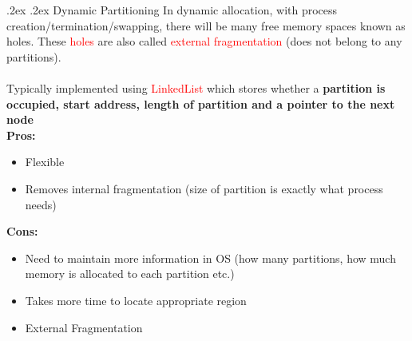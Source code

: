 \documentclass[13pt,landscape,a4paper]{article}
\makeatletter
\newcommand\red[1]{\textcolor{red}{#1}}
\renewcommand{\subsubsection}{\@startsection{subsubsection}{1}{0mm}%
    {.2ex}%
    {.2ex}%
    {\rmfamily\bfseries}}
\makeatother
\begin{document}
\begin{multicols*}{3}
        \subsubsection{Dynamic Partitioning}
        In dynamic allocation, with process creation/termination/swapping, there will be many free memory spaces known as holes. These \red{holes} are also called \red{external fragmentation} (does not belong to any partitions). \\\\
        Typically implemented using \red{LinkedList} which stores whether a \textbf{partition is occupied, start address, length of partition and a pointer to the next node}\\
        \textbf{Pros:}
        \begin{itemize}
            \item Flexible
            \item Removes internal fragmentation (size of partition is exactly what process needs)
        \end{itemize}
        \textbf{Cons:}
        \begin{itemize}
            \item Need to maintain more information in OS (how many partitions, how much memory is allocated to each partition etc.)
            \item Takes more time to locate appropriate region
            \item External Fragmentation
        \end{itemize}
        \columnbreak

\end{multicols*}
\end{document}
